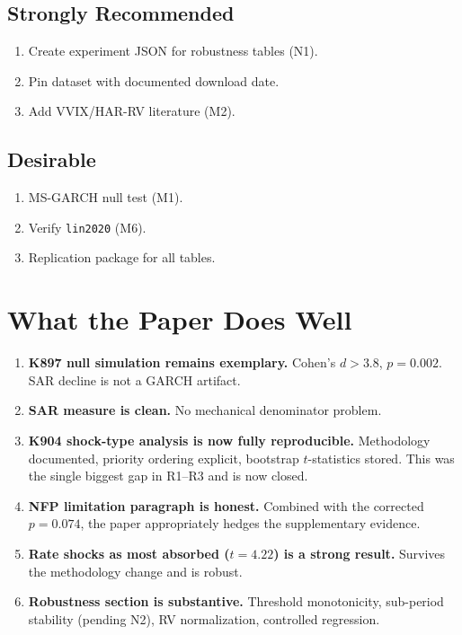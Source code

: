 \documentclass[12pt,a4paper]{article}
\begin{document}
\subsection*{Strongly Recommended}
\begin{enumerate}[resume]
\item Create experiment JSON for robustness tables (N1).
\item Pin dataset with documented download date.
\item Add VVIX/HAR-RV literature (M2).
\end{enumerate}

\subsection*{Desirable}
\begin{enumerate}[resume]
\item MS-GARCH null test (M1).
\item Verify \texttt{lin2020} (M6).
\item Replication package for all tables.
\end{enumerate}

\bigskip

\section*{What the Paper Does Well}

\begin{enumerate}
\item \textbf{K897 null simulation remains exemplary.} Cohen's $d > 3.8$, $p = 0.002$. SAR decline is not a GARCH artifact.
\item \textbf{SAR measure is clean.} No mechanical denominator problem.
\item \textbf{K904 shock-type analysis is now fully reproducible.} Methodology documented, priority ordering explicit, bootstrap $t$-statistics stored. This was the single biggest gap in R1--R3 and is now closed.
\item \textbf{NFP limitation paragraph is honest.} Combined with the corrected $p = 0.074$, the paper appropriately hedges the supplementary evidence.
\item \textbf{Rate shocks as most absorbed ($t = 4.22$) is a strong result.} Survives the methodology change and is robust.
\item \textbf{Robustness section is substantive.} Threshold monotonicity, sub-period stability (pending N2), RV normalization, controlled regression.
\end{enumerate}
\end{document}
